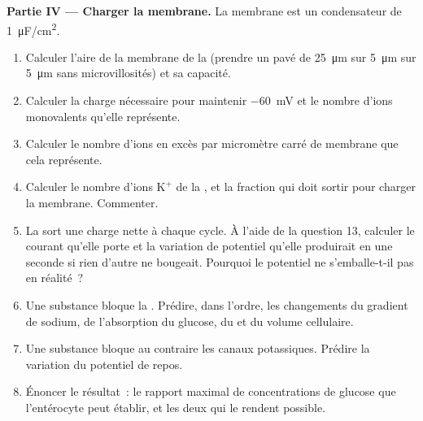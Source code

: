 \begin{problem}
\medskip
\noindent\textbf{Partie IV --- Charger la membrane.}
La membrane est un condensateur de \qty{1}{\micro F/cm^2}.
\begin{enumerate}[resume]
  \item Calculer l'aire de la membrane de la  (prendre un pavé de
        \qty{25}{\micro m} sur \qty{5}{\micro m} sur \qty{5}{\micro m}
        sans microvillosités) et sa capacité.
  \item Calculer la charge nécessaire pour maintenir \qty{-60}{mV} et le
        nombre d'ions monovalents qu'elle représente.
  \item Calculer le nombre d'ions en excès par micromètre carré de
        membrane que cela représente.
  \item Calculer le nombre d'ions $\mathrm{K^+}$ de la , et la
        fraction qui doit sortir pour charger la membrane. Commenter.
  \item La  sort une charge nette à chaque cycle. À l'aide de la
        question 13, calculer le courant qu'elle porte et la variation
        de potentiel qu'elle produirait en une seconde si rien d'autre
        ne bougeait. Pourquoi le potentiel ne s'emballe-t-il pas en
        réalité~?
  \item Une substance bloque la . Prédire, dans l'ordre, les
        changements du gradient de sodium, de l'absorption du glucose,
        du  et du volume cellulaire.
  \item Une substance bloque au contraire les canaux potassiques.
        Prédire la variation du potentiel de repos.
  \item Énoncer le résultat~: le rapport maximal de concentrations de
        glucose que l'entérocyte peut établir, et les deux  qui le rendent possible.
\end{enumerate}
\end{problem}
